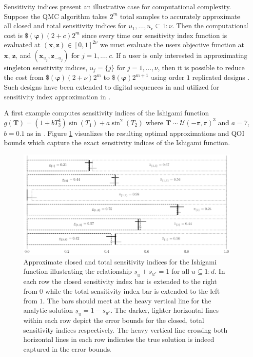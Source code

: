 \documentclass[graybox]{svmult}
\begin{document}
Sensitivity indices present an illustrative case for computational complexity. Suppose the QMC algorithm takes $2^m$ total samples to accurately approximate all closed and total sensitivity indices for $u_1,\dots,u_c \subseteq 1:\nu$. Then the computational cost is $\$(\boldsymbol{\varphi})(2+c)2^m$ since every time our sensitivity index function is evaluated at $(\boldsymbol{x},\boldsymbol{z}) \in [0,1]^{2\nu}$ we must evaluate the users objective function at $\boldsymbol{x}$, $\boldsymbol{z}$, and $(\boldsymbol{x}_{u_j},\boldsymbol{z}_{-{u_j}})$ for $j=1,\dots,c$. If a user is only interested in approximating singleton sensitivity indices, $u_j = \{j\}$ for $j=1,\dots,\nu$, then it is possible to reduce the cost from $\$(\boldsymbol{\varphi})(2+\nu)2^m$ to $\$(\boldsymbol{\varphi})2^{m+1}$ using order $1$ replicated designs \cite{alex2008comparison,tissot2015randomized}. Such designs have been extended to  digital sequences in \cite{replicated_designs_sobol_seq} and utilized for sensitivity index approximation in \cite{reliable_sobol_indices_approx}.

A first example computes sensitivity indices of the Ishigami function \cite{ishigami1990importance} $g(\boldsymbol{T}) = (1+bT_3^4)\sin(T_1)+a\sin^2(T_2)$ where $\boldsymbol{T} \sim \mathcal{U}(-\pi,\pi)^3$ and $a=7$, $b=0.1$ as in \cite{crestaux2007polynomial,marrel2009calculations}. Figure \ref{SoRa_fig:ishigami} visualizes the resulting optimal approximations and QOI bounds which capture the exact sensitivity indices of the Ishigami function. 

\begin{figure}[t]
    \centering
    \includegraphics[width=.8\textwidth]{figs/ishigami.pdf}
    \caption{Approximate closed and total sensitivity indices for the Ishigami function illustrating the relationship $\underline{s}_u + \overline{s}_{u^c} = 1$ for all $u \subseteq 1:d$. In each row the closed sensitivity index bar is  extended to the right from $0$ while the total sensitivity index bar is extended to the left from $1$. The bars should meet at the heavy vertical line for the analytic solution $\underline{s}_u=1-\overline{s}_{u^c}$. The darker, lighter horizontal lines within each row depict the error bounds for the closed, total sensitivity indices respectively. The heavy vertical line crossing both horizontal lines in each row indicates the true solution is indeed captured in the error bounds.}
    \label{SoRa_fig:ishigami}
\end{figure}
\end{document}
